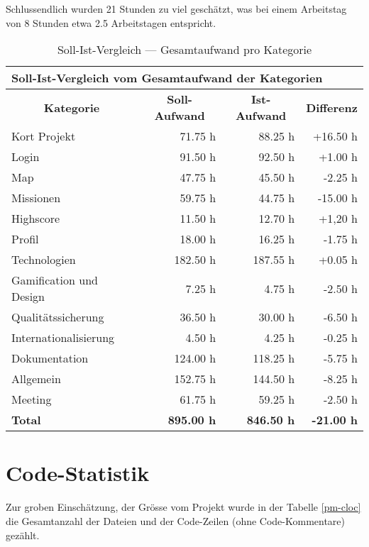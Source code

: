 Schlussendlich wurden 21 Stunden zu viel geschätzt, was bei einem Arbeitstag von 8 Stunden etwa 2.5 Arbeitstagen entspricht. 


\begin{table}[H]
\centering
\label{pm-arbeitsaufwand-kategorie-ges}
\begin{tabular}{|l|r|r|r|}
\hline
\multicolumn{4}{|l|}{\textbf{Soll-Ist-Vergleich vom Gesamtaufwand der Kategorien}} \\
\hline
\multicolumn{1}{|c|}{\textbf{Kategorie}} & \multicolumn{1}{|c|}{\textbf{Soll-Aufwand}} & \multicolumn{1}{|c|}{\textbf{Ist-Aufwand}} & \multicolumn{1}{|c|}{\textbf{Differenz}}\\
\hline
Kort Projekt & 71.75 h & 88.25 h & +16.50 h \\
\hline
Login & 91.50 h & 92.50 h & +1.00 h \\
\hline
Map & 47.75	h & 45.50 h & -2.25 h \\
\hline
Missionen & 59.75 h & 44.75 h & -15.00 h \\
\hline
Highscore & 11.50 h & 12.70 h & +1,20 h \\
\hline
Profil & 18.00 h & 16.25 h & -1.75 h \\
\hline
Technologien & 182.50 h & 187.55 h & +0.05 h \\
\hline
Gamification und Design & 7.25 h & 4.75 h & -2.50 h \\
\hline
Qualitätssicherung & 36.50 h & 30.00 h & -6.50 h \\
\hline
Internationalisierung & 4.50 h & 4.25 h & -0.25 h \\
\hline
Dokumentation & 124.00 h & 118.25 h & -5.75 h \\
\hline
Allgemein & 152.75 h & 144.50 h & -8.25 h \\
\hline
Meeting & 61.75 h & 59.25 h & -2.50 h \\
\hline
\textbf{Total} & \textbf{895.00 h} & \textbf{846.50 h} & \textbf{-21.00 h} \\
\hline
\end{tabular}
\caption{Soll-Ist-Vergleich --- Gesamtaufwand pro Kategorie}
\end{table}

\section{Code-Statistik}

Zur groben Einschätzung, der Grösse vom Projekt wurde in der Tabelle \ref{pm-cloc} die Gesamtanzahl der Dateien und der Code-Zeilen (ohne Code-Kommentare) gezählt.

